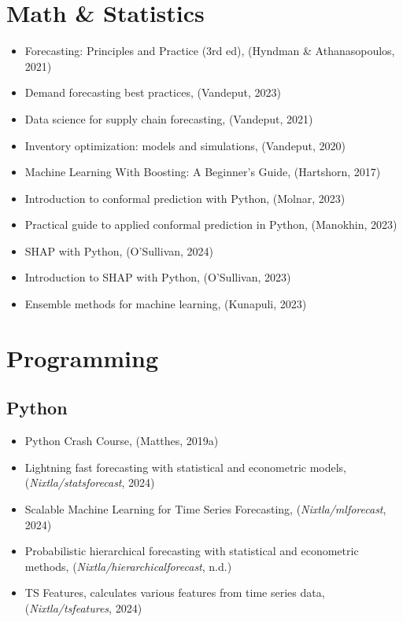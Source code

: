 \documentclass[
  american,
  10,
  a4paper,
]{book}
\providecommand{\tightlist}{%
  \setlength{\itemsep}{0pt}\setlength{\parskip}{0pt}}
\theoremstyle{definition}
\theoremstyle{remark}
\begin{document}
\section{Math \& Statistics}\label{math-statistics}

\begin{itemize}
\tightlist
\item
  Forecasting: Principles and Practice (3rd ed), (Hyndman \&
  Athanasopoulos, 2021)
\item
  Demand forecasting best practices, (Vandeput, 2023)
\item
  Data science for supply chain forecasting, (Vandeput, 2021)
\item
  Inventory optimization: models and simulations, (Vandeput, 2020)
\item
  Machine Learning With Boosting: A Beginner's Guide, (Hartshorn, 2017)
\item
  Introduction to conformal prediction with Python, (Molnar, 2023)
\item
  Practical guide to applied conformal prediction in Python, (Manokhin,
  2023)
\item
  SHAP with Python, (O'Sullivan, 2024)
\item
  Introduction to SHAP with Python, (O'Sullivan, 2023)
\item
  Ensemble methods for machine learning, (Kunapuli, 2023)
\end{itemize}

\section{Programming}\label{programming}

\subsection{Python}\label{python}

\begin{itemize}
\tightlist
\item
  Python Crash Course, (Matthes, 2019a)
\item
  Lightning fast forecasting with statistical and econometric models,
  (\emph{Nixtla/statsforecast}, 2024)
\item
  Scalable Machine Learning for Time Series Forecasting,
  (\emph{Nixtla/mlforecast}, 2024)
\item
  Probabilistic hierarchical forecasting with statistical and
  econometric methods, (\emph{Nixtla/hierarchicalforecast}, n.d.)
\item
  TS Features, calculates various features from time series data,
  (\emph{Nixtla/tsfeatures}, 2024)
\end{itemize}
\end{document}

